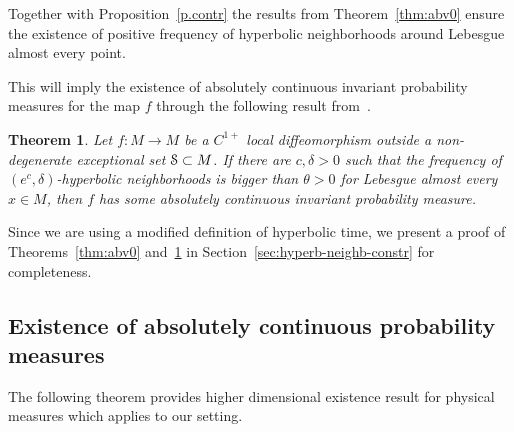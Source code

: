 \documentclass[reqno,12pt,a4paper]{amsart}
\theoremstyle{plain}
\newtheorem{theorem}{Theorem}[section]
\theoremstyle{definition}
\begin{document}
Together with Proposition~\ref{p.contr} the results from
Theorem~\ref{thm:abv0} ensure the existence of positive
frequency of hyperbolic neighborhoods around Lebesgue almost
every point.

This will imply the existence of absolutely continuous
invariant probability measures for the map $f$ through the
following result from~\cite{Pinheiro05}.

\begin{theorem}
  \label{thm:abv1}
  Let $f: M\to M$ be a $C^{1+}$ local diffeomorphism outside
  a non-degenerate exceptional set ${\EuScript{S}}\subset M$. If there
  are $c,\delta>0$
  such that the frequency of $(e^c,\delta)$-hyperbolic
  neighborhoods is bigger than $\theta>0$ for Lebesgue
  almost every $x\in M$, then $f$ has some absolutely
  continuous invariant probability measure.
\end{theorem}

Since we are using a modified definition of hyperbolic time,
we present a proof of Theorems~\ref{thm:abv0}
and~\ref{thm:abv1} in Section~\ref{sec:hyperb-neighb-constr}
for completeness.

\subsection{Existence of absolutely continuous probability
  measures}
\label{sec:existence-absolut-co}

The following theorem provides higher dimensional existence
result for physical measures which applies to our
setting.
\end{document}
